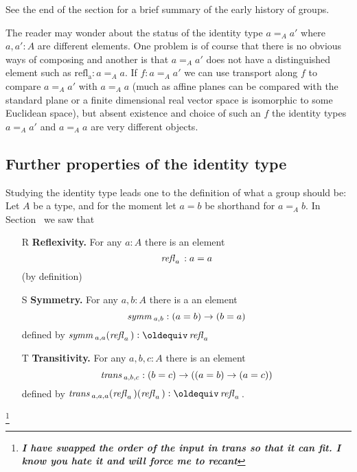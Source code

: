 See the end of the section  for a brief summary of the early history of groups.  
\begin{remark}
  The reader may wonder about the status of the identity type $a=_Aa'$ where $a,a':A$ are different elements.  One problem is of course that there is no obvious ways of composing and another is that $a=_Aa'$ does not have a distinguished element such as $\mathrm{refl{}_a}:a=_Aa$.
If $f:a=_Aa'$ we can use transport along $f$ to compare $a=_Aa'$ with $a=_Aa$ (much as affine planes can be compared with the standard plane or a finite dimensional real vector space is isomorphic to some Euclidean space), but absent existence and choice of such an $f$ the identity types $a=_Aa'$ and $a=_Aa$ are very different objects.
\end{remark}

\subsection{Further properties of the identity type}
Studying the identity type leads one to the definition of what a group should be:
Let $A$ be a type, and for the moment let $a=b$ be shorthand for $a=_Ab$.  In Section~ we saw that
\begin{enumerate}
\item[R] {\bf Reflexivity.} For any $a:A$ there is an element 
$$\mathop{{\it refl}_{a}}{}:a=a$$ (by definition)
\item[S] {\bf Symmetry.} For any $a,b:A$ there is a an element $$\mathop{\mathit{symm}}{}_{a,b}:(a=b)\to (b=a)$$ defined by $\symm{}_{a,a}(\refl a{})\defequi\refl a{}$
\item[T] {\bf Transitivity.} For any $a,b,c:A$ there is an element $$\mathop{\mathit{trans}}{}_{a,b,c}:(b=c)\to((a=b)\to(a=c))$$ defined by $\trans{}_{a,a,a}(\refl a{})(\refl a{})\defequi \refl a{}$.
\end{enumerate}
\footnote{\em\bf I have swapped the order of the input in trans so that it can fit.  I know you hate it and will force me to recant}

